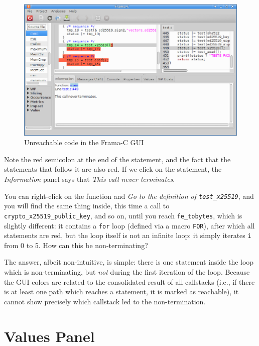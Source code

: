 \begin{figure}[hbt]
\centering
\includegraphics[width=\textwidth]{gui-images/gui2.png}
\caption{Unreachable code in the Frama-C GUI}
\label{fig:gui-unreachable}
\end{figure}

Note the red semicolon at the end of the statement, and the fact that
the statements that follow it are also red. If we click on the statement, the
\emph{Information} panel says that \emph{This call never terminates}.

You can right-click on the function and \emph{Go to the definition of
\texttt{test\_x25519}}, and you will find the same thing inside, this time a call
to \texttt{crypto\_x25519\_public\_key}, and so on, until you reach
\texttt{fe\_tobytes}, which is slightly different: it contains a
\texttt{for} loop (defined via a macro \texttt{FOR}), after which all
statements are red, but the loop itself is not an infinite loop: it
simply iterates \texttt{i} from 0 to 5. How can this be non-terminating?

The answer, albeit non-intuitive, is simple: there is one statement
inside the loop which is non-terminating, but \emph{not} during the
first iteration of the loop. Because the GUI colors are related to the
consolidated result of all callstacks (i.e., if there is at least one
path which reaches a statement, it is marked as reachable), it cannot
show precisely which callstack led to the non-termination.


\section{Values Panel}\label{values-panel}

